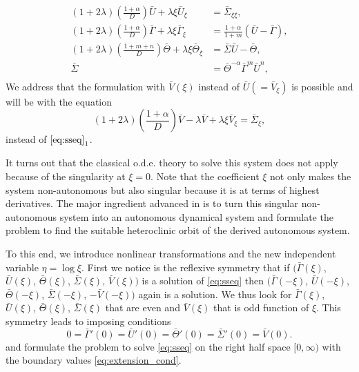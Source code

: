 \documentclass[a4paper,11pt]{article}
\def\bG{{\bar{\Gamma}}}
\def\bV{{\bar{V}}}
\def\bTh{{\bar{\Theta}}}
\def\bS{{\bar{\Sigma}}}
\def\bU{{\bar{U}}}
\theoremstyle{remark}
\begin{document}
\begin{equation}\label{eq:sseq}
\begin{aligned}
 (1+2 \lambda) \left(\frac{1 + \alpha}{D}\right) \bU + \lambda \xi \bU_\xi &= \bS_{\xi\xi},\\
 (1+2 \lambda) \left(\frac{1 + \alpha}{D}\right) \bG + \lambda \xi \bG_\xi&=\frac{1+ \alpha}{1+m}(\bU - \bG),\\
 (1+2 \lambda) \left(\frac{1 + m+n}{D}\right) \bTh + \lambda \xi \bTh_\xi&=\bS\bU - \bTh,\\
 \bS &= \bTh^ {- \alpha} \bG ^m \bU ^n,\\
\end{aligned}
\end{equation}
We address that the formulation with $\bV(\xi)$ instead of $\bU(=\bV_\xi)$ is possible and will be with the equation
$$ (1+2 \lambda) \left(\frac{1 + \alpha}{D}\right) \bV - \lambda \bV + \lambda \xi \bV_\xi=\bS_\xi,$$
instead of $\eqref{eq:sseq}_1$.

It turns out that the classical o.d.e. theory to solve this system does not apply because of the singularity at $\xi=0$. Note that the coefficient $\xi$ not only makes the system non-autonomous but also singular because it is at terms of highest derivatives. The major ingredient advanced in \cite{KOT14,LKT17} is to turn this singular non-autonomous system into an autonomous dynamical system and formulate the problem to find the suitable heteroclinic orbit of the derived autonomous system.

To this end, we introduce nonlinear transformations and the new independent variable $\eta = \log\xi$. First we notice is the reflexive symmetry that if $\big(\bG(\xi)$, $\bU(\xi)$, $\bTh(\xi)$, $\bS(\xi)$, $\bV(\xi)\big)$ is a solution of \eqref{eq:sseq} then $\big(\bG(-\xi)$, $\bU(-\xi)$, $\bTh(-\xi)$, $\bS(-\xi)$, $-\bV(-\xi)\big)$ again is a solution. We thus look for $\bG(\xi)$, $\bU(\xi)$, $\bTh(\xi)$, $\bS(\xi)$ that are even and $\bV(\xi)$ that is odd function of $\xi$. This symmetry leads to imposing conditions
\begin{equation} \label{eq:extension_cond}
 0=\bG'(0)=\bU'(0)=\bTh'(0)=\bS'(0)=\bV(0).
\end{equation}
and formulate the problem to solve \eqref{eq:sseq} on the right half space $[0,\infty)$ with the boundary values \eqref{eq:extension_cond}.
\end{document}
